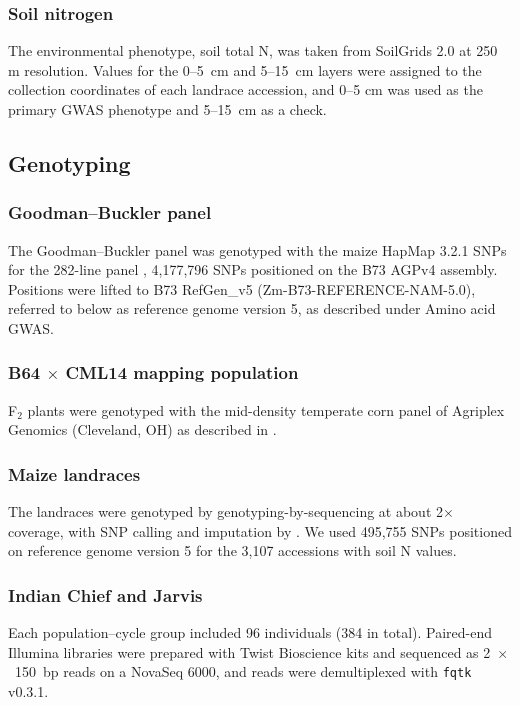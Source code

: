 \documentclass[namedate,unnumsec,webpdf,contemporary,large]{oup-authoring-template}
\begin{document}
\subsubsection{Soil nitrogen}
The environmental phenotype, soil total N, was taken from SoilGrids 2.0 \citep{Poggio2021SoilGrids} at 250 m resolution. Values for the 0--5~cm and 5--15~cm layers were assigned to the collection coordinates of each landrace accession, and 0--5 cm was used as the primary GWAS phenotype and 5--15~cm as a check.

\subsection{Genotyping}

\subsubsection{Goodman--Buckler panel}
The Goodman--Buckler panel was genotyped with the maize HapMap 3.2.1 SNPs for the 282-line panel \citep{Bukowski2018HapMap3}, 4,177,796 SNPs positioned on the B73 AGPv4 assembly. Positions were lifted to B73 RefGen\_v5 (Zm-B73-REFERENCE-NAM-5.0), referred to below as reference genome version 5, as described under Amino acid GWAS.

\subsubsection{B64 $\times$ CML14 mapping population}
F$_2$ plants were genotyped with the mid-density temperate corn panel of Agriplex Genomics (Cleveland, OH) as described in \citet{Fitzsimmons2026KernelKitchen}.

\subsubsection{Maize landraces}
The landraces were genotyped by genotyping-by-sequencing at about 2$\times$ coverage, with SNP calling and imputation by \citet{RomeroNavarro2017Landraces}. We used 495,755 SNPs positioned on reference genome version 5 for the 3,107 accessions with soil N values.

\subsubsection{Indian Chief and Jarvis}

Each population--cycle group included 96 individuals (384 in total). Paired-end Illumina libraries were prepared with Twist Bioscience kits and sequenced as 2~$\times$~150~bp reads on a NovaSeq 6000, and reads were demultiplexed with \texttt{fqtk} v0.3.1.
\end{document}
